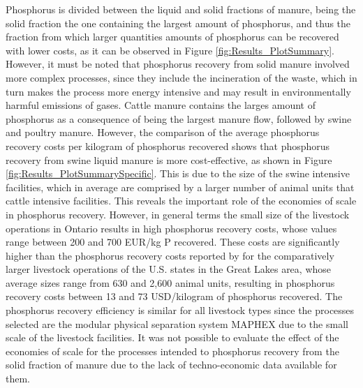 \documentclass[authoryear]{elsarticle}
\begin{document}
Phosphorus is divided between the liquid and solid fractions of manure, being the solid fraction the one containing the largest amount of phosphorus, and thus the fraction from which larger quantities amounts of phosphorus can be recovered with lower costs, as it can be observed in Figure \ref{fig:Results_PlotSummary}. However, it must be noted that phosphorus recovery from solid manure involved more complex processes, since they include the incineration of the waste, which in turn makes the process more energy intensive and may result in environmentally harmful emissions of gases. Cattle manure contains the larges amount of phosphorus as a consequence of being the largest manure flow, followed by swine and poultry manure. However, the comparison of the average phosphorus recovery costs per kilogram of phosphorus recovered shows that phosphorus recovery from swine liquid manure is more cost-effective, as shown in Figure \ref{fig:Results_PlotSummarySpecific}. This is due to the size of the swine intensive facilities, which in average are comprised by a larger number of animal units that cattle intensive facilities. This reveals the important role of the economies of scale in phosphorus recovery. However, in general terms the small size of the livestock operations in Ontario results in high phosphorus recovery costs, whose values range between 200 and 700 EUR/kg P recovered. These costs are significantly higher than the phosphorus recovery costs reported by \citet{martin2022analysis} for the comparatively larger livestock operations of the U.S. states in the Great Lakes area, whose average sizes range from 630 and 2,600 animal units, resulting in phosphorus recovery costs between 13 and 73 USD/kilogram of phosphorus recovered. The phosphorus recovery efficiency is similar for all livestock types since the processes selected are the modular physical separation system MAPHEX due to the small scale of the livestock facilities.
It was not possible to evaluate the effect of the economies of scale for the processes intended to phosphorus recovery from the solid fraction of manure due to the lack of techno-economic data available for them.
\end{document}
